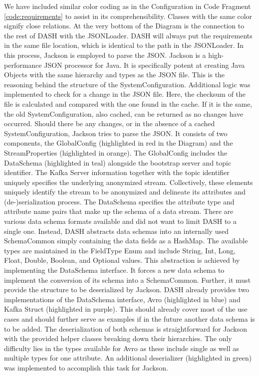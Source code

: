 We have included similar color coding as in the Configuration in Code Fragment \ref{code:requirements} to assist in its comprehensibility. Classes with the same color signify close relations. At the very bottom of the Diagram is the connection to the rest of \ac{DASH} with the JSONLoader. \ac{DASH} will always put the requirements in the same file location, which is identical to the path in the JSONLoader. In this process, Jackson is employed to parse the JSON. Jackson is a high-performance JSON processor for Java. It is specifically potent at creating Java Objects with the same hierarchy and types as the JSON file. This is the reasoning behind the structure of the SystemConfiguration. Additional logic was implemented to check for a change in the JSON file. Here, the checksum of the file is calculated and compared with the one found in the cache. If it is the same, the old SystemConfiguration, also cached, can be returned as no changes have occurred. Should there be any changes, or in the absence of a cached SystemConfiguration, Jackson tries to parse the JSON. It consists of two components, the GlobalConfig (highlighted in red in the Diagram) and the StreamProperties (highlighted in orange). The GlobalConfig includes the DataSchema (highlighted in teal) alongside the bootstrap server and topic identifier. The Kafka Server information together with the topic identifier uniquely specifies the underlying anonymized stream. Collectively, these elements uniquely identify the stream to be anonymized and delineate its attributes and (de-)serialization process. The DataSchema specifies the attribute type and attribute name pairs that make up the schema of a data stream. There are various data schema formats available and did not want to limit \ac{DASH} to a single one. Instead, \ac{DASH} abstracts data schemas into an internally used SchemaCommon simply containing the data fields as a HashMap. The available types are maintained in the FieldType Enum and include String, Int, Long, Float, Double, Boolean, and Optional values. This abstraction is achieved by implementing the DataSchema interface. It forces a new data schema to implement the conversion of its schema into a SchemaCommon. Further, it must provide the structure to be deserialized by Jackson. \ac{DASH} already provides two implementations of the DataSchema interface, Avro (highlighted in blue) and Kafka Struct (highlighted in purple). This should already cover most of the use cases and should further serve as examples if in the future another data schema is to be added. The deserialization of both schemas is straightforward for Jackson with the provided helper classes breaking down their hierarchies. The only difficulty lies in the types available for Avro as these include single as well as multiple types for one attribute. An additional deserializer (highlighted in green) was implemented to accomplish this task for Jackson.\par


